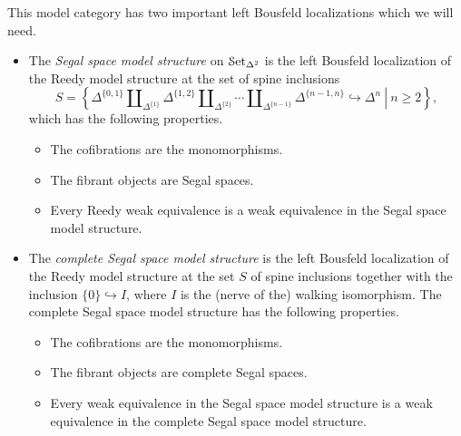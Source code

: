 \documentclass[main.tex]{subfiles}
\begin{document}
This model category has two important left Bousfeld localizations which we will need.

\begin{itemize}
  \item The \emph{Segal space model structure} on $\mathcal{S}\mathrm{et}_{\Delta^{2}}$ is the left Bousfeld localization of the Reedy model structure at the set of spine inclusions
    \begin{equation*}
      S = \left\{\left.\Delta^{\{0, 1\}} \amalg_{\Delta^{\{1\}}} \Delta^{\{1, 2\}} \amalg_{\Delta^{\{2\}}} \cdots \amalg_{\Delta^{\{n-1\}}} \Delta^{\{n-1, n\}} \hookrightarrow \Delta^{n}\ \right|\ n \geq 2\right\},
    \end{equation*}
    which has the following properties.
    \begin{itemize}
      \item The cofibrations are the monomorphisms.

      \item The fibrant objects are Segal spaces.

      \item Every Reedy weak equivalence is a weak equivalence in the Segal space model structure.
    \end{itemize}

  \item The \emph{complete Segal space model structure} is the left Bousfeld localization of the Reedy model structure at the set $S$ of spine inclusions together with the inclusion $\{0\} \hookrightarrow I$, where $I$ is the (nerve of the) walking isomorphism. The complete Segal space model structure has the following properties.
    \begin{itemize}
      \item The cofibrations are the monomorphisms.

      \item The fibrant objects are complete Segal spaces.

      \item Every weak equivalence in the Segal space model structure is a weak equivalence in the complete Segal space model structure.
    \end{itemize}
\end{itemize}
\end{document}
